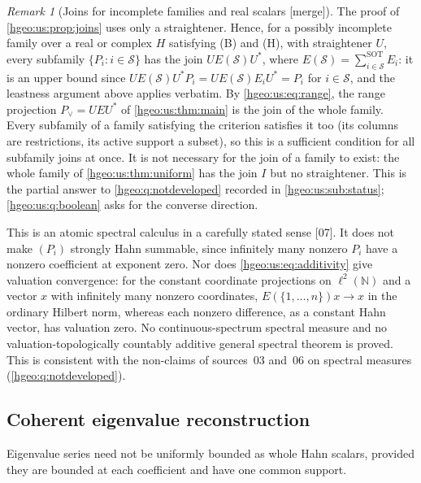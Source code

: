 \documentclass[11pt,letterpaper]{article}
\numberwithin{equation}{section}
\theoremstyle{definition}
\theoremstyle{remark}
\newtheorem{remark}[remark]{Remark}
\newcommand{\N}{\mathbb N}
\newcommand{\src}[1]{\textup{\textsf{\small[#1]}}}
\newcommand{\mergetag}{\textup{\textsf{\small[merge]}}}
\newcommand{\sSOT}{\mathop{\sum}\nolimits^{\mathrm{SOT}}}
\begin{document}
\begin{remark}[Joins for incomplete families and real scalars
\mergetag]\label{hgeo:us:rem:joins}
The proof of \cref{hgeo:us:prop:joins} uses only a straightener. Hence, for a
possibly incomplete family over a real or complex $H$ satisfying (B) and (H),
with straightener $U$, every subfamily $\{P_i:i\in\mathcal S\}$ has the join
$UE(\mathcal S)U^*$, where $E(\mathcal S)=\sSOT_{i\in\mathcal S}E_i$: it is an
upper bound since $UE(\mathcal S)U^*P_i=UE(\mathcal S)E_iU^*=P_i$ for
$i\in\mathcal S$, and the leastness argument above applies verbatim. By
\eqref{hgeo:us:eq:range}, the range projection $P_\vee=UEU^*$ of
\cref{hgeo:us:thm:main} is the join of the whole family. Every subfamily of
a family satisfying the criterion satisfies it too (its columns are
restrictions, its active support a subset), so this is a sufficient
condition for all subfamily joins at once. It is not necessary for the
join of a family to exist: the whole family of \cref{hgeo:us:thm:uniform} has
the join $I$ but no straightener.
This is the partial answer to \cref{hgeo:q:notdeveloped} recorded in
\cref{hgeo:us:sub:status}; \cref{hgeo:us:q:boolean} asks for the converse
direction.
\end{remark}

This is an atomic spectral calculus in a carefully stated sense \src{07}. It
does not make $(P_i)$ strongly Hahn summable, since infinitely many nonzero
$P_i$ have a nonzero coefficient at exponent zero. Nor does
\eqref{hgeo:us:eq:additivity} give valuation convergence: for the constant
coordinate projections on $\ell^2(\N)$ and a vector $x$ with infinitely many
nonzero coordinates, $E(\{1,\ldots,n\})x\to x$ in the ordinary Hilbert norm,
whereas each nonzero difference, as a constant Hahn vector, has valuation
zero. No continuous-spectrum spectral measure and no valuation-topologically
countably additive general spectral theorem is proved. This is consistent with
the non-claims of sources~03 and~06 on spectral measures
(\cref{hgeo:q:notdeveloped}).

\subsection{Coherent eigenvalue reconstruction}
Eigenvalue series need not be uniformly bounded as whole Hahn scalars,
provided they are bounded at each coefficient and have one common support.
\end{document}

